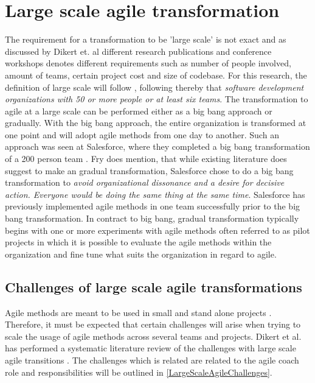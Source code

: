 \documentclass[11pt,a4paper]{report}
\begin{document}
\section{Large scale agile transformation}
\label{largeScaleAgileTransformationRelatedWork}
The requirement for a transformation to be 'large scale' is not exact and as discussed by Dikert et. al \cite{dikert2016challenges} different research publications and conference workshops denotes different requirements such as number of people involved, amount of teams, certain project cost and size of codebase. For this research, the definition of large scale will follow \cite{dikert2016challenges}, following thereby that {\textit{
software development organizations with 50 or more people or at least six teams}}.
The transformation to agile at a large scale can be performed either as a big bang approach or gradually. With the big bang approach, the entire organization is transformed at one point and will adopt agile methods from one day to another. Such an approach was seen at Salesforce, where they completed a big bang transformation of a 200 person team \cite{fry2007large}. Fry \cite{fry2007large} does mention, that while existing literature does suggest to make an gradual transformation, Salesforce chose to do a big bang transformation to \textit{avoid organizational
dissonance and a desire for decisive action. Everyone would be doing the same thing at the same time}. Salesforce has previously implemented agile methods in one team successfully prior to the big bang transformation. 
In contract to big bang, gradual transformation typically begins with one or more experiments with agile methods \cite{gandomani2013exploring} \cite{benefield2008rolling} \cite{goodman2008s} often referred to as pilot projects in which it is possible to evaluate the agile methods within the organization and fine tune what suits the organization in regard to agile.

\subsection{Challenges of large scale agile transformations}
Agile methods are meant to be used in small and stand alone projects \cite{boehm2005management}. Therefore, it must be expected that certain challenges will arise when trying to scale the usage of agile methods across several teams and projects. Dikert et al. has performed a systematic literature review of the challenges with large scale agile transitions \cite{dikert2016challenges}. The challenges which is related are related to the agile coach role and responsibilities will be outlined in \autoref{LargeScaleAgileChallenges}.
\end{document}
